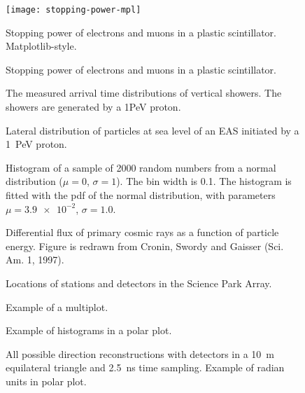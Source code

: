 \documentclass[a4paper,11pt]{article}
\begin{document}
\begin{figure}
\centering
\texttt{[image: stopping-power-mpl]}
\caption{Stopping power of electrons and muons in a plastic scintillator.
Matplotlib-style.}
\end{figure}

\begin{figure}
\centering

\caption{Stopping power of electrons and muons in a plastic scintillator.}
\end{figure}

\begin{figure}
\centering
{
}
\caption{The measured arrival time distributions of vertical showers. The
showers are generated by a 1PeV proton.}
\end{figure}

\begin{figure}
\centering

\caption{Lateral distribution of particles at sea level of an EAS
initiated by a \SI{1}{\peta\electronvolt} proton.}
\end{figure}

\begin{figure}
\centering

\caption{Histogram of a sample of \num{2000} random numbers from a normal
distribution ($\mu = 0$, $\sigma = 1$).  The bin width is \num{.1}.  The
histogram is fitted with the pdf of the normal distribution, with
parameters $\mu = \num{3.9e-2}$, $\sigma=\num{1.0}$.}
\end{figure}

\begin{figure}
\centering

\caption{Differential flux of primary cosmic rays as a function of
particle energy.  Figure is redrawn from Cronin, Swordy and Gaisser (Sci.
Am. 1, 1997).}
\end{figure}

\begin{figure}
\centering
{
}
\caption{Locations of stations and detectors in the Science Park Array.}
\end{figure}

\begin{figure}
\centering

\caption{Example of a multiplot.}
\end{figure}

\begin{figure}
\centering

\caption{Example of histograms in a polar plot.}
\end{figure}

\begin{figure}
\centering

\caption{All possible direction reconstructions with detectors in a
\SI{10}{\meter} equilateral triangle and \SI{2.5}{\nano\second} time
sampling. Example of radian units in polar plot.}
\end{figure}
\end{document}
